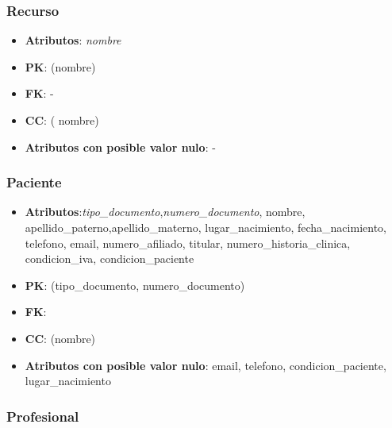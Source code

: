 \documentclass[a4paper,11pt]{article}
\begin{document}
\subsubsection{\textbf{Recurso}}

\begin{itemize}

\item 
\textbf{Atributos}: \emph{nombre}

\item 
\textbf{PK}: (nombre)

\item
\textbf{FK}: -

\item 
\textbf{CC}: ( nombre)

\item 
\textbf{Atributos con posible valor nulo}: -

\end{itemize}
\subsubsection{\textbf{Paciente}}

\begin{itemize}

\item 
\textbf{Atributos}:\emph{tipo\_documento},\emph{numero\_documento}, nombre, apellido\_paterno,apellido\_materno, lugar\_nacimiento, fecha\_nacimiento, telefono, email, numero\_afiliado, titular, numero\_historia\_clinica, condicion\_iva, condicion\_paciente
\item 
\textbf{PK}: (tipo\_documento, numero\_documento)

\item
\textbf{FK}:

\item 
\textbf{CC}: (nombre)

\item 
\textbf{Atributos con posible valor nulo}: email, telefono, condicion\_paciente, lugar\_nacimiento

\end{itemize}
\subsubsection{\textbf{Profesional}}
\end{document}

